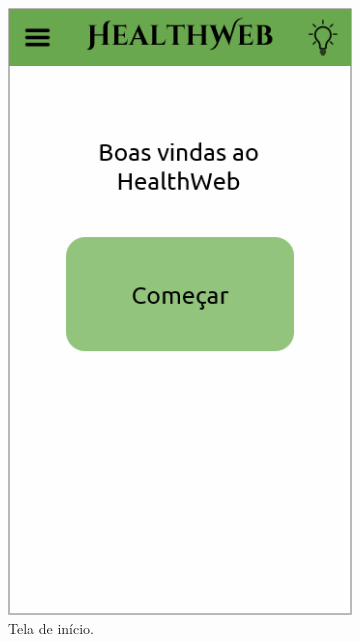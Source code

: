 \begin{figure}[htbp]
	\centering
	\hspace{0.24\linewidth}
	\hfill
	\begin{subfigure}{0.24\linewidth}
		\centering
		\includegraphics[width=\linewidth]{figure/prototype/mobile/home.png}
		\caption{Tela de início.}
		\label{fig:mobile:home}
	\end{subfigure}
\hfill
	\begin{subfigure}{0.24\linewidth}
		\centering

\end{subfigure}
\end{figure}
